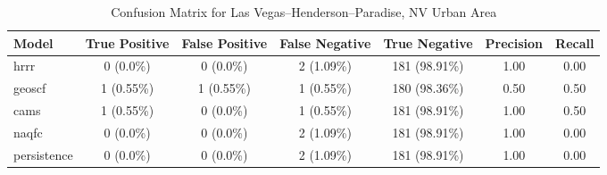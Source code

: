 \begin{table}[h!]
\centering
\begin{tabular}{lcccccc}
\hline
Model & True Positive & False Positive & False Negative & True Negative & Precision & Recall\\ \hline
hrrr & 0 (0.0\%) & 0 (0.0\%) & 2 (1.09\%) & 181 (98.91\%) & \cellcolor{green!25}1.00 & \cellcolor{green!25}0.00 \\ 
geoscf & 1 (0.55\%) & 1 (0.55\%) & 1 (0.55\%) & 180 (98.36\%) & \cellcolor{red!25}0.50 & \cellcolor{green!25}0.50 \\ 
cams & 1 (0.55\%) & 0 (0.0\%) & 1 (0.55\%) & 181 (98.91\%) & \cellcolor{green!25}1.00 & \cellcolor{green!25}0.50 \\ 
naqfc & 0 (0.0\%) & 0 (0.0\%) & 2 (1.09\%) & 181 (98.91\%) & \cellcolor{green!25}1.00 & \cellcolor{green!25}0.00 \\ 
persistence & 0 (0.0\%) & 0 (0.0\%) & 2 (1.09\%) & 181 (98.91\%) & 1.00 & 0.00 \\ 
\hline
\end{tabular}
\caption{Confusion Matrix for Las Vegas--Henderson--Paradise, NV Urban Area}
\end{table}
